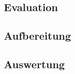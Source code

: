\subsection{Evaluation}
\label{evaluation}

\subsection{Aufbereitung}

\subsection{Auswertung}
% 
% 
